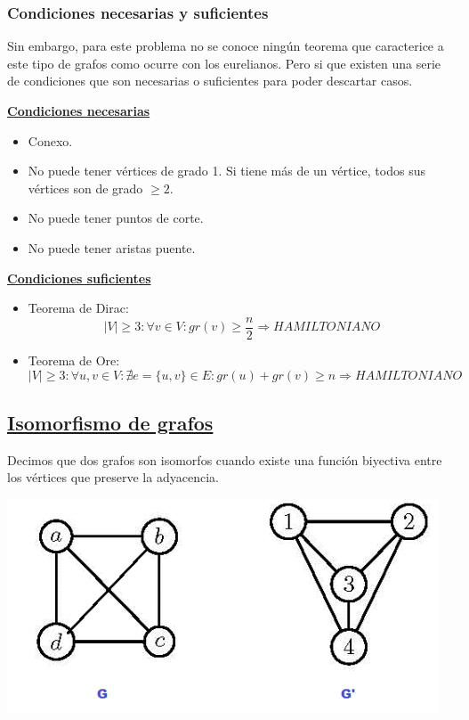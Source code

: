 \documentclass[10pt,a4paper,openright]{book}
\begin{document}
\subsubsection*{Condiciones necesarias y suficientes}
Sin embargo, para este problema no se conoce ningún teorema que caracterice a este tipo de grafos como ocurre con los eurelianos. Pero si que existen una serie de condiciones que son necesarias o suficientes para poder descartar casos.

\underline{\textbf{Condiciones necesarias}}
\begin{itemize}
\item Conexo.
\item No puede tener vértices de grado 1. Si tiene más de un vértice, todos sus vértices son de grado $\geq 2$.
\item No puede tener puntos de corte.
\item No puede tener aristas puente.
\end{itemize}

\underline{\textbf{Condiciones suficientes}}
\begin{itemize}
\item Teorema de Dirac:
$$|V|\geq 3: \forall v\in V: gr(v)\geq \frac{n}{2}\Rightarrow HAMILTONIANO$$

\item Teorema de Ore:
$$|V|\geq 3: \forall u,v\in V: \nexists e=\{u,v\}\in E: gr(u)+gr(v)\geq n\Rightarrow HAMILTONIANO$$
\end{itemize}

\subsection*{\underline{Isomorfismo de grafos}}
Decimos que dos grafos son isomorfos cuando existe una función biyectiva entre los vértices que preserve la adyacencia.

\begin{center}
\includegraphics[scale=0.65]{Isomorfismo de grafos}
\end{center}
\end{document}
